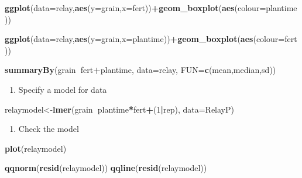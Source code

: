 \documentclass[]{book}
\newenvironment{Shaded}{\begin{snugshade}}{\end{snugshade}}
\newcommand{\KeywordTok}[1]{\textcolor[rgb]{0.13,0.29,0.53}{\textbf{#1}}}
\newcommand{\DataTypeTok}[1]{\textcolor[rgb]{0.13,0.29,0.53}{#1}}
\newcommand{\DecValTok}[1]{\textcolor[rgb]{0.00,0.00,0.81}{#1}}
\newcommand{\OperatorTok}[1]{\textcolor[rgb]{0.81,0.36,0.00}{\textbf{#1}}}
\newcommand{\NormalTok}[1]{#1}
\providecommand{\tightlist}{%
  \setlength{\itemsep}{0pt}\setlength{\parskip}{0pt}}
\theoremstyle{definition}
\theoremstyle{definition}
\theoremstyle{definition}
\theoremstyle{remark}
\begin{document}
\begin{Shaded}
\begin{Highlighting}[]
\KeywordTok{ggplot}\NormalTok{(}\DataTypeTok{data=}\NormalTok{relay,}\KeywordTok{aes}\NormalTok{(}\DataTypeTok{y=}\NormalTok{grain,}\DataTypeTok{x=}\NormalTok{fert))}\OperatorTok{+}\KeywordTok{geom_boxplot}\NormalTok{(}\KeywordTok{aes}\NormalTok{(}\DataTypeTok{colour=}\NormalTok{plantime))}

\KeywordTok{ggplot}\NormalTok{(}\DataTypeTok{data=}\NormalTok{relay,}\KeywordTok{aes}\NormalTok{(}\DataTypeTok{y=}\NormalTok{grain,}\DataTypeTok{x=}\NormalTok{plantime))}\OperatorTok{+}\KeywordTok{geom_boxplot}\NormalTok{(}\KeywordTok{aes}\NormalTok{(}\DataTypeTok{colour=}\NormalTok{fert))}

\KeywordTok{summaryBy}\NormalTok{(grain}\OperatorTok{~}\NormalTok{fert}\OperatorTok{+}\NormalTok{plantime, }\DataTypeTok{data=}\NormalTok{relay, }\DataTypeTok{FUN=}\KeywordTok{c}\NormalTok{(mean,median,sd))}
\end{Highlighting}
\end{Shaded}

\begin{enumerate}
\def\labelenumi{\arabic{enumi}.}
\setcounter{enumi}{4}
\tightlist
\item
  Specify a model for data
\end{enumerate}

\begin{Shaded}
\begin{Highlighting}[]
\NormalTok{relaymodel<-}\KeywordTok{lmer}\NormalTok{(grain}\OperatorTok{~}\NormalTok{plantime}\OperatorTok{*}\NormalTok{fert}\OperatorTok{+}\NormalTok{(}\DecValTok{1}\OperatorTok{|}\NormalTok{rep), }\DataTypeTok{data=}\NormalTok{RelayP)}
\end{Highlighting}
\end{Shaded}

\begin{enumerate}
\def\labelenumi{\arabic{enumi}.}
\setcounter{enumi}{5}
\tightlist
\item
  Check the model
\end{enumerate}

\begin{Shaded}
\begin{Highlighting}[]
\KeywordTok{plot}\NormalTok{(relaymodel)}

\KeywordTok{qqnorm}\NormalTok{(}\KeywordTok{resid}\NormalTok{(relaymodel))}
\KeywordTok{qqline}\NormalTok{(}\KeywordTok{resid}\NormalTok{(relaymodel))}
\end{Highlighting}
\end{Shaded}
\end{document}
